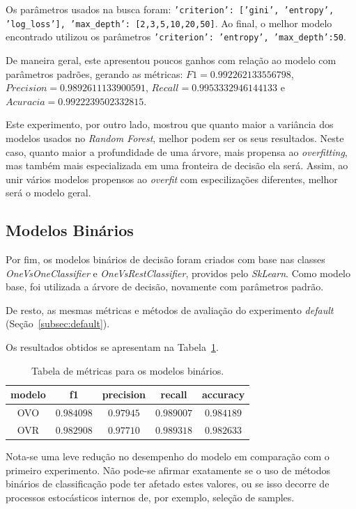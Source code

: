 \documentclass{paper}
\begin{document}
Os parâmetros usados na busca foram: \texttt{'criterion': ['gini', 'entropy', 'log\_loss'], 'max\_depth': [2,3,5,10,20,50]}. Ao final, o melhor modelo encontrado utilizou os parâmetros \texttt{'criterion': 'entropy', 'max\_depth':50}.

De maneira geral, este apresentou poucos ganhos com relação ao modelo com parâmetros padrões, gerando as métricas: $F1 = 0.992262133556798$, $Precision = 0.9892611133900591$, $Recall = 0.9953332946144133$ e $Acuracia = 0.9922239502332815$.

Este experimento, por outro lado, mostrou que quanto maior a variância dos modelos usados no \textit{Random Forest}, melhor podem ser os seus resultados. Neste caso, quanto maior a profundidade de uma árvore, mais propensa ao \textit{overfitting}, mas também mais especializada em uma fronteira de decisão ela será. Assim, ao unir vários modelos propensos ao \textit{overfit} com especilizações diferentes, melhor será o modelo geral.

\newpage

\subsection{Modelos Binários}

Por fim, os modelos binários de decisão foram criados com base nas classes \textit{OneVsOneClassifier} e \textit{OneVsRestClassifier}, providos pelo \textit{SkLearn}. Como modelo base, foi utilizada a árvore de decisão, novamente com parâmetros padrão. 

De resto, as mesmas métricas e métodos de avaliação do experimento \textit{default} (Seção~\ref{subsec:default}).

Os resultados obtidos se apresentam na Tabela~\ref{tb:ovo}.

\begin{table}[h!] 
\centering
\begin{tabular}{ c | c c c c } 
 modelo & f1 & precision & recall & accuracy \\
\hline
OVO    & $0.984098$ &	$0.97945$ &	$0.989007$ &	$0.984189$ \\
OVR	   & $0.982908$ &	$0.97710$ &	$0.989318$ &	$0.982633$ 
\end{tabular}
\caption{Tabela de métricas para os modelos binários.}
\label{tb:ovo}
\end{table}

Nota-se uma leve redução no desempenho do modelo em comparação com o primeiro experimento. Não pode-se afirmar exatamente se o uso de métodos binários de classificação pode ter afetado estes valores, ou se isso decorre de processos estocásticos internos de, por exemplo, seleção de samples. 
\end{document}
